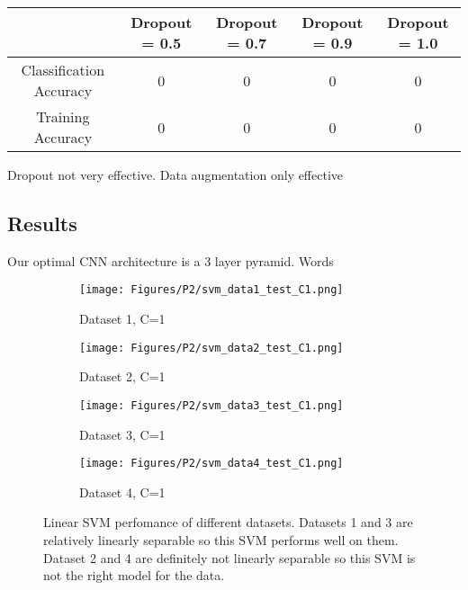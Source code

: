 \documentclass[10pt,twoside]{article}
\begin{document}
\begin{center}
 \begin{tabular}{||c c c c c||} 
 \hline
  & Dropout = 0.5 & Dropout = 0.7 & Dropout = 0.9  & Dropout = 1.0 \\ [0.5ex] 
 \hline\hline
 Classification Accuracy & 0 & 0 & 0 & 0 \\ 
 \hline
 Training Accuracy       & 0 & 0 & 0 & 0 \\
 \hline
\end{tabular}
\end{center}

Dropout not very effective.
Data augmentation only effective


\subsection{Results}
Our optimal CNN architecture is a 3 layer pyramid. Words

\begin{figure}[h]
        \begin{subfigure}[b]{0.25\textwidth}
                \centering
                \texttt{[image: Figures/P2/svm\_data1\_test\_C1.png]}
                \caption{Dataset 1, C=1}
        \end{subfigure}%
        \begin{subfigure}[b]{0.25\textwidth}
                \centering
                \texttt{[image: Figures/P2/svm\_data2\_test\_C1.png]}
                \caption{Dataset 2, C=1}
        \end{subfigure}%
        \begin{subfigure}[b]{0.25\textwidth}
                \centering
                \texttt{[image: Figures/P2/svm\_data3\_test\_C1.png]}
                \caption{Dataset 3, C=1}
        \end{subfigure}%
        \begin{subfigure}[b]{0.25\textwidth}
                \centering
                \texttt{[image: Figures/P2/svm\_data4\_test\_C1.png]}
                \caption{Dataset 4, C=1}
        \end{subfigure}
        \caption{Linear SVM perfomance of different datasets. Datasets 1 and 3 are relatively linearly separable so this SVM performs well on them. Dataset 2 and 4 are definitely not linearly separable so this SVM is not the right model for the data.}\label{fig:animals}
\end{figure}

\vfill
\end{document}
